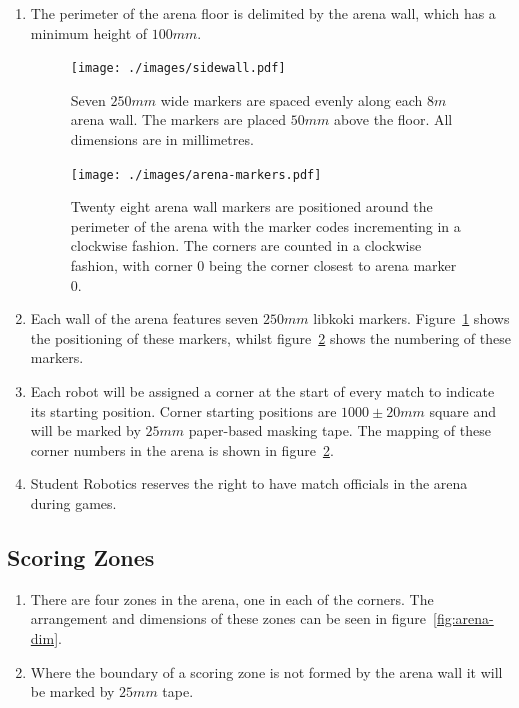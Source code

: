 \begin{enumerate}
\item The perimeter of the arena floor is delimited by the arena wall, which has a minimum height of $100mm$.

\begin{figure}
  \centering
  \texttt{[image: ./images/sidewall.pdf]}
  \caption{Seven $250mm$ wide markers are spaced evenly along each $8m$ arena wall.
           The markers are placed $50mm$ above the floor.
           All dimensions are in millimetres.}
  \label{fig:arena-wall}
\end{figure}

\begin{figure}
  \centering
  \texttt{[image: ./images/arena-markers.pdf]}
  \caption{Twenty eight arena wall markers are positioned around the perimeter of the arena with the marker codes incrementing in a clockwise fashion.
           The corners are counted in a clockwise fashion, with corner 0 being the corner closest to arena marker 0.}
  \label{fig:arena-zones}
\end{figure}

\item Each wall of the arena features seven $250mm$ libkoki markers.
      Figure~\ref{fig:arena-wall} shows the positioning of these markers, whilst figure~\ref{fig:arena-zones} shows the numbering of these markers.

\item Each robot will be assigned a corner at the start of every match to indicate its starting position.
      Corner starting positions are $1000 \pm 20mm$ square and will be marked by $25mm$ paper-based masking tape.
      The mapping of these corner numbers in the arena is shown in figure~\ref{fig:arena-zones}.

\item Student Robotics reserves the right to have match officials in the arena during games.

\end{enumerate}


\subsection{Scoring Zones}
\label{sub:Zones}

\begin{enumerate}
\item There are four zones in the arena, one in each of the corners.
      The arrangement and dimensions of these zones can be seen in figure~\ref{fig:arena-dim}.

\item Where the boundary of a scoring zone is not formed by the arena wall it will be marked by $25mm$ tape.
\end{enumerate}

